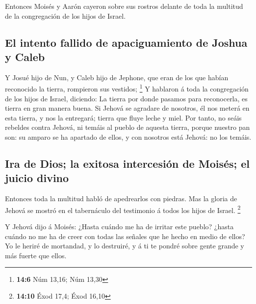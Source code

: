  Entonces Moisés y Aarón cayeron sobre sus rostros delante
de toda la multitud de la congregación de los hijos de Israel.

\hypertarget{el-intento-fallido-de-apaciguamiento-de-joshua-y-caleb}{%
\subsection{El intento fallido de apaciguamiento de Joshua y
Caleb}\label{el-intento-fallido-de-apaciguamiento-de-joshua-y-caleb}}

 Y Josué hijo de Nun, y Caleb hijo de Jephone, que eran de
los que habían reconocido la tierra, rompieron sus vestidos; \footnote{\textbf{14:6}
  Núm 13,16; Núm 13,30}  Y hablaron á toda la congregación
de los hijos de Israel, diciendo: La tierra por donde pasamos para
reconocerla, es tierra en gran manera buena.  Si Jehová se
agradare de nosotros, él nos meterá en esta tierra, y nos la entregará;
tierra que fluye leche y miel.  Por tanto, no seáis rebeldes
contra Jehová, ni temáis al pueblo de aquesta tierra, porque nuestro pan
son: su amparo se ha apartado de ellos, y con nosotros está Jehová: no
los temáis.

\hypertarget{ira-de-dios-la-exitosa-intercesiuxf3n-de-moisuxe9s-el-juicio-divino}{%
\subsection{Ira de Dios; la exitosa intercesión de Moisés; el juicio
divino}\label{ira-de-dios-la-exitosa-intercesiuxf3n-de-moisuxe9s-el-juicio-divino}}

 Entonces toda la multitud habló de apedrearlos con
piedras. Mas la gloria de Jehová se mostró en el tabernáculo del
testimonio á todos los hijos de Israel. \footnote{\textbf{14:10} Éxod
  17,4; Éxod 16,10}

 Y Jehová dijo á Moisés: ¿Hasta cuándo me ha de irritar
este pueblo? ¿hasta cuándo no me ha de creer con todas las señales que
he hecho en medio de ellos?  Yo le heriré de mortandad, y
lo destruiré, y á ti te pondré sobre gente grande y más fuerte que
ellos.

